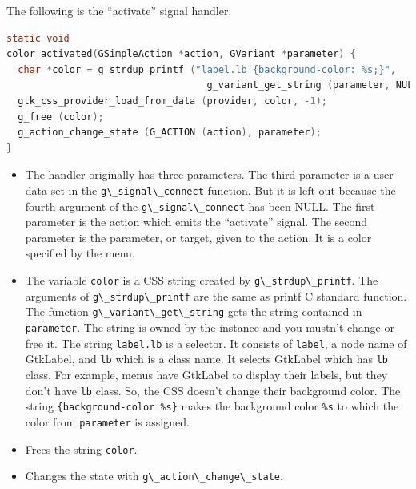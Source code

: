 The following is the ``activate'' signal handler.

\begin{lstlisting}[language=C]
static void
color_activated(GSimpleAction *action, GVariant *parameter) {
  char *color = g_strdup_printf ("label.lb {background-color: %s;}",
                                   g_variant_get_string (parameter, NULL));
  gtk_css_provider_load_from_data (provider, color, -1);
  g_free (color);
  g_action_change_state (G_ACTION (action), parameter);
}
\end{lstlisting}

\begin{itemize}
\tightlist
\item
  The handler originally has three parameters. The third parameter is a
  user data set in the \passthrough{\lstinline!g\_signal\_connect!}
  function. But it is left out because the fourth argument of the
  \passthrough{\lstinline!g\_signal\_connect!} has been NULL. The first
  parameter is the action which emits the ``activate'' signal. The
  second parameter is the parameter, or target, given to the action. It
  is a color specified by the menu.
\item
  The variable \passthrough{\lstinline!color!} is a CSS string created
  by \passthrough{\lstinline!g\_strdup\_printf!}. The arguments of
  \passthrough{\lstinline!g\_strdup\_printf!} are the same as printf C
  standard function. The function
  \passthrough{\lstinline!g\_variant\_get\_string!} gets the string
  contained in \passthrough{\lstinline!parameter!}. The string is owned
  by the instance and you mustn't change or free it. The string
  \passthrough{\lstinline!label.lb!} is a selector. It consists of
  \passthrough{\lstinline!label!}, a node name of GtkLabel, and
  \passthrough{\lstinline!lb!} which is a class name. It selects
  GtkLabel which has \passthrough{\lstinline!lb!} class. For example,
  menus have GtkLabel to display their labels, but they don't have
  \passthrough{\lstinline!lb!} class. So, the CSS doesn't change their
  background color. The string
  \passthrough{\lstinline!\{background-color \%s\}!} makes the
  background color \passthrough{\lstinline!\%s!} to which the color from
  \passthrough{\lstinline!parameter!} is assigned.
\item
  Frees the string \passthrough{\lstinline!color!}.
\item
  Changes the state with
  \passthrough{\lstinline!g\_action\_change\_state!}.
\end{itemize}

